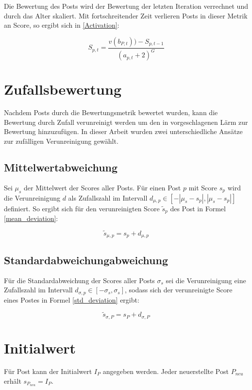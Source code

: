 Die Bewertung des Posts wird der Bewertung der letzten Iteration verrechnet und durch das Alter skaliert. Mit fortschreitender Zeit verlieren Posts in dieser Metrik an Score, so ergibt sich in \ref{Activation}:

\begin{equation}
\label{Activation}
S_{p,t} = \frac{v(b_{P,t})) - S_{p,t-1}}{(a_{p,t} + 2)^{G}}
\end{equation}


\section{Zufallsbewertung}

Nachdem Posts durch die Bewertungsmetrik bewertet wurden, kann die Bewertung durch Zufall verunreinigt werden um den in \cite{Luu} vorgeschlagenen Lärm zur Bewertung hinzuzufügen. In dieser Arbeit wurden zwei unterschiedliche Ansätze zur zufälligen Verunreinigung gewählt.

\subsection{Mittelwertabweichung}

Sei $\mu_s$ der Mittelwert der Scores aller Posts. Für einen Post $p$ mit Score $s_p$ wird die Verunreinigung $d$ als Zufallszahl im Intervall $d_{\mu,p} \in [-|\mu_s - s_p|,|\mu_s - s_p|]$ definiert. So ergibt sich für den verunreinigten Score $\tilde{s}_p$ des Post in Formel \ref{mean_deviation}:

\begin{equation}
\label{mean_deviation}
\tilde{s}_{\mu,p} =  s_p + d_{\mu,p}
\end{equation} 

\subsection{Standardabweichungabweichung}

Für die Standardabweichung der Scores aller Posts $\sigma_s$ sei die Verunreinigung eine Zufallszahl im Intervall $d_{\sigma,p} \in [-\sigma_s,\sigma_s]$, sodass sich der verunreinigte Score eines Postes in Formel \ref{std_deviation} ergibt:

\begin{equation}
\label{std_deviation}
\tilde{s}_{\sigma,P} = s_P + d_{\sigma,P}
\end{equation}

\section{Initialwert}

Für Post kann der Initialwert $I_P$ angegeben werden. Jeder neuerstellte Post $P_{neu}$ erhält $s_{P_{neu}} = I_P$.



	